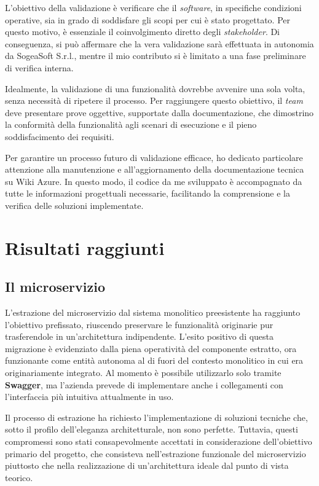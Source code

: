         \vspace{0.2 em}
        \noindent L'obiettivo della validazione è verificare che il \textit{software}, in specifiche condizioni operative, sia in grado di soddisfare gli scopi per cui è stato progettato. Per questo motivo, è essenziale il coinvolgimento diretto degli \textit{stakeholder}. Di conseguenza, si può affermare che la vera validazione sarà effettuata in autonomia da SogeaSoft S.r.l., mentre il mio contributo si è limitato a una fase preliminare di verifica interna.

        \vspace{0.2 em}
        \noindent Idealmente, la validazione di una funzionalità dovrebbe avvenire una sola volta, senza necessità di ripetere il processo. Per raggiungere questo obiettivo, il \textit{team} deve presentare prove oggettive, supportate dalla documentazione, che dimostrino la conformità della funzionalità agli scenari di esecuzione e il pieno soddisfacimento dei requisiti.  

        \vspace{0.2 em}
        \noindent Per garantire un processo futuro di validazione efficace, ho dedicato particolare attenzione alla manutenzione e all’aggiornamento della documentazione tecnica su Wiki Azure. In questo modo, il codice da me sviluppato è accompagnato da tutte le informazioni progettuali necessarie, facilitando la comprensione e la verifica delle soluzioni implementate.


    \section{Risultati raggiunti}
        \subsection{Il microservizio}
        L'estrazione del microservizio dal sistema monolitico preesistente ha raggiunto l'obiettivo prefissato, riuscendo preservare le funzionalità originarie pur trasferendole in un'architettura indipendente. L'esito positivo di questa migrazione è evidenziato dalla piena operatività del componente estratto, ora funzionante come entità autonoma al di fuori del contesto monolitico in cui era originariamente integrato. Al momento è possibile utilizzarlo solo tramite \textbf{Swagger}, ma l'azienda prevede di implementare anche i collegamenti con l'interfaccia più intuitiva attualmente in uso.

        \vspace{0.2 em}
        \noindent Il processo di estrazione ha richiesto l'implementazione di soluzioni tecniche che, sotto il profilo dell'eleganza architetturale, non sono perfette. Tuttavia, questi compromessi sono stati consapevolmente accettati in considerazione dell'obiettivo primario del progetto, che consisteva nell'estrazione funzionale del microservizio piuttosto che nella realizzazione di un'architettura ideale dal punto di vista teorico.


